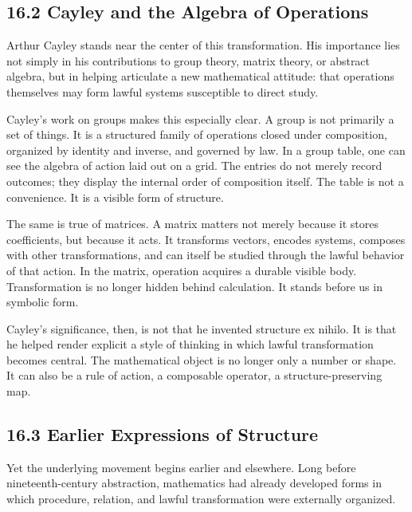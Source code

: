 \hypertarget{cayley-and-the-algebra-of-operations}{%
\subsection{16.2 Cayley and the Algebra of
Operations}\label{cayley-and-the-algebra-of-operations}}

Arthur Cayley stands near the center of this transformation. His
importance lies not simply in his contributions to group theory, matrix
theory, or abstract algebra, but in helping articulate a new
mathematical attitude: that operations themselves may form lawful
systems susceptible to direct study.

Cayley's work on groups makes this especially clear. A group is not
primarily a set of things. It is a structured family of operations
closed under composition, organized by identity and inverse, and
governed by law. In a group table, one can see the algebra of action
laid out on a grid. The entries do not merely record outcomes; they
display the internal order of composition itself. The table is not a
convenience. It is a visible form of structure.

The same is true of matrices. A matrix matters not merely because it
stores coefficients, but because it acts. It transforms vectors, encodes
systems, composes with other transformations, and can itself be studied
through the lawful behavior of that action. In the matrix, operation
acquires a durable visible body. Transformation is no longer hidden
behind calculation. It stands before us in symbolic form.

Cayley's significance, then, is not that he invented structure ex
nihilo. It is that he helped render explicit a style of thinking in
which lawful transformation becomes central. The mathematical object is
no longer only a number or shape. It can also be a rule of action, a
composable operator, a structure-preserving map.

\hypertarget{earlier-expressions-of-structure}{%
\subsection{16.3 Earlier Expressions of
Structure}\label{earlier-expressions-of-structure}}

Yet the underlying movement begins earlier and elsewhere. Long before
nineteenth-century abstraction, mathematics had already developed forms
in which procedure, relation, and lawful transformation were externally
organized.

